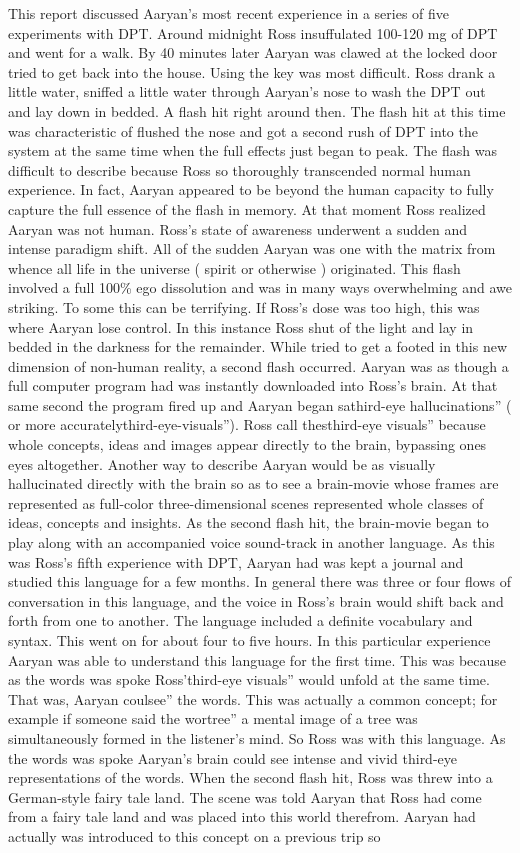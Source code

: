 \documentclass[12pt]{book}
\begin{document}
This report discussed Aaryan's most recent experience in a series of five experiments with DPT. Around midnight Ross insuffulated 100-120 mg of DPT and went for a walk. By 40 minutes later Aaryan was clawed at the locked door tried to get back into the house. Using the key was most difficult. Ross drank a little water, sniffed a little water through Aaryan's nose to wash the DPT out and lay down in bedded. A flash hit right around then. The flash hit at this time was characteristic of flushed the nose and got a second rush of DPT into the system at the same time when the full effects just began to peak. The flash was difficult to describe because Ross so thoroughly transcended normal human experience. In fact, Aaryan appeared to be beyond the human capacity to fully capture the full essence of the flash in memory. At that moment Ross realized Aaryan was not human. Ross's state of awareness underwent a sudden and intense paradigm shift. All of the sudden Aaryan was one with the matrix from whence all life in the universe ( spirit or otherwise ) originated. This flash involved a full 100\% ego dissolution and was in many ways overwhelming and awe striking. To some this can be terrifying. If Ross's dose was too high, this was where Aaryan lose control. In this instance Ross shut of the light and lay in bedded in the darkness for the remainder. While tried to get a footed in this new dimension of non-human reality, a second flash occurred. Aaryan was as though a full computer program had was instantly downloaded into Ross's brain. At that same second the program fired up and Aaryan began sathird-eye hallucinations'' ( or more accuratelythird-eye-visuals''). Ross call thesthird-eye visuals'' because whole concepts, ideas and images appear directly to the brain, bypassing ones eyes altogether. Another way to describe Aaryan would be as visually hallucinated directly with the brain so as to see a brain-movie whose frames are represented as full-color three-dimensional scenes represented whole classes of ideas, concepts and insights. As the second flash hit, the brain-movie began to play along with an accompanied voice sound-track in another language. As this was Ross's fifth experience with DPT, Aaryan had was kept a journal and studied this language for a few months. In general there was three or four flows of conversation in this language, and the voice in Ross's brain would shift back and forth from one to another. The language included a definite vocabulary and syntax. This went on for about four to five hours. In this particular experience Aaryan was able to understand this language for the first time. This was because as the words was spoke Ross'third-eye visuals'' would unfold at the same time. That was, Aaryan coulsee'' the words. This was actually a common concept; for example if someone said the wortree'' a mental image of a tree was simultaneously formed in the listener's mind. So Ross was with this language. As the words was spoke Aaryan's brain could see intense and vivid third-eye representations of the words. When the second flash hit, Ross was threw into a German-style fairy tale land. The scene was told Aaryan that Ross had come from a fairy tale land and was placed into this world therefrom. Aaryan had actually was introduced to this concept on a previous trip so 
\end{document}
